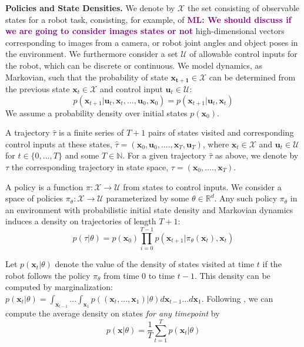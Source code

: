\documentclass[10pt, conference]{ieeeconf}      %
\newcommand{\bu}{\mathbf{u}}
\newcommand{\bx}{\mathbf{x}}
\newcommand{\mlnote}[1]{\ifthenelse{\boolean{include-notes}}%
 {\textcolor{purple}{\textbf{ML: #1}}}{}}
\begin{document}
\noindent\textbf{Policies and State Densities.}
We denote by $\mathcal{X}$ the set consisting of observable states for a robot task, consisting, for example, of \mlnote{We should discuss if we are going to consider images states or not}
high-dimensional vectors corresponding to images from a camera, or robot joint angles and object poses in the environment.
We furthermore consider a set $\mathcal{U}$ of allowable control inputs for the robot, which can be discrete or
continuous. We model dynamics, as Markovian, such that the probability of state $\mathbf{x_{t+1}}\in
\mathcal{X}$ can be determined from the previous state $\mathbf{x}_t\in\mathcal{X}$ and control input $\mathbf{u}_t\in
\mathcal{U}$: 
$$p(\bx_{t+1}|\bu_{t},\bx_{t}, \ldots, \bu_{0}, \bx_{0})=p(\bx_{t+1}|\bu_{t}, \bx_t)$$
We assume a probability density over initial states $p(\bx_0)$.

A trajectory $\hat{\tau}$ is a finite series of $T+1$ pairs of states visited and corresponding
control inputs at these states, $\hat{\tau} = (\mathbf{x}_0,\mathbf{u}_0, ...., \mathbf{x}_T,\mathbf{u}_T)$, where $\bx_t\in \mathcal{X}$
and $\bu_t\in \mathcal{U}$ for $t\in \{0, \ldots, T\}$ and some $T\in \mathbb{N}$.  
For a given trajectory $\hat{\tau}$ as above, we denote by ${\tau}$ the corresponding trajectory in state space,
${\tau} = (\bx_0,....,\bx_T)$.


A policy is a function $\pi: \mathcal{X} \to \mathcal{U}$ from states to control inputs. 
We consider a space of policies $\pi_{\theta}:\mathcal{X}\to \mathcal{U}$ parameterized by some $\theta\in \mathbb{R}^d$. Any such policy $\pi_{\theta}$ in an environment with probabilistic initial state density and Markovian dynamics
induces a density on trajectories of length $T+1$: $$p(\tau | \theta)=
p(\bx_0)\prod_{i=0}^{T-1}p(\bx_{t+1}|\pi_{\theta}(\bx_t),\bx_t)$$


Let $p(\bx_t|\theta)$ denote the value of the density of states visited at time $t$ if the robot follows the policy
$\pi_{\theta}$ from time $0$ to time $t-1$. This density can be computed by marginalization: $p(\bx_t|\theta) =
\int_{\bx_{t-1}}...\int_{\bx_1} p((\bx_t,...,\bx_1)|\theta) d\bx_{t-1}...d\bx_1$. Following \cite{ross2010reduction}, we can compute
the average density on states \emph{for any timepoint} by 
\begin{equation}
p(\bx|\theta) = \frac{1}{T} \sum^T_{t=1} p(\bx_t|\theta)
\label{eq:density}
\end{equation}
\end{document}
